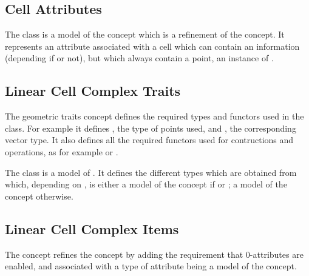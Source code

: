 \subsection{Cell Attributes}\label{ssec-attribute-wp}

The
class is a model of the  concept which is
a refinement of the  concept. It represents an
attribute associated with a cell which can contain an information
(depending if  or not), but which always contain a
point, an instance of .


\subsection{Linear Cell Complex Traits}\label{ssec-lcc-traits}

The  geometric traits concept defines the
required types and functors used in the 
class. For example it defines , the type of points used,
and , the corresponding vector type.  It also defines all
the required functors used for contructions and operations, as for
example  or
.

The class  is a model of
. It defines the different types which
are obtained from  which, depending on , is either a model of
the concept  if  or ; a model of the
concept  otherwise.


\subsection{Linear Cell Complex Items}\label{ssec-lcc-item}

The  concept refines the
 concept by adding the requirement that
0-attributes are enabled, and associated with a type of attribute
being a model of the  concept.  

